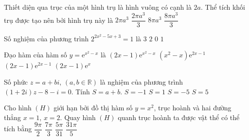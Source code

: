 \begin{ex}%
	Thiết diện qua trục của một hình trụ là hình vuông có cạnh là $2a$. Thể tích khối trụ được tạo nên bởi hình trụ này là
	\choice
	{\True $2\pi a^3$}
	{$\dfrac{2\pi a^3}{3}$}
	{$8\pi a^3$}
	{$\dfrac{8\pi a^3}{3}$}
\end{ex}

\begin{ex}%
	Số nghiệm của phương trình $2^{2x^2-5x+3}=1$ là
	\choice
	{$3$}
	{\True $2$}
	{$0$}
	{$1$}
	\loigiai{
		Ta có $2^{2x^2-5x+3}=1=2^0 \Leftrightarrow 2x^2-5x+3=0 \Leftrightarrow \left[\begin{aligned}
		&x=1 \\
		&x=\dfrac{3}{2}.
		\end{aligned}\right. $}
\end{ex}

\begin{ex}%
	Đạo hàm của hàm số $y=\mathrm{e}^{x^2-x}$ là
	\choice
	{\True $(2x-1)\mathrm{e}^{x^2-x}$}
	{$(x^2-x)\mathrm{e}^{2x-1}$}
	{$(2x-1)\mathrm{e}^{2x-1}$}
	{$(2x-1)\mathrm{e}^x$}
\end{ex}

\begin{ex}%
	Số phức $z=a+bi$, $\left(a,b\in \mathbb{R}\right)$ là nghiệm của phương trình $(1+2i)z-8-i=0$. Tính $S=a+b$.
	\choice
	{\True $S=-1$}
	{$S=1$}
	{$S=-5$}
	{$S=5$}
\end{ex}

\begin{ex}%
	Cho hình $(H)$ giới hạn bởi đồ thị hàm số $y=x^2$, trục hoành và hai đường thẳng $x=1$, $x=2$. Quay hình $(H)$ quanh trục hoành ta được vật thể có thể tích bằng
	\choice
	{$\dfrac{9\pi}{2}$}
	{$\dfrac{7\pi}{3}$}
	{$\dfrac{5\pi}{31}$}
	{\True $\dfrac{31\pi}{5}$}
\end{ex}


